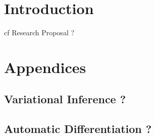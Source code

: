 \documentclass[twoside,10pt,openany,a4paper]{rapport}
\begin{document}
\mainmatter


\chapter{Introduction}
cf Research Proposal ?























\appendix
\chapter*{Appendices}
\renewcommand{\thesection}{\Alph{section}}
\section{Variational Inference ?}
\section{Automatic Differentiation ?}

\nocite{*}



\end{document}
